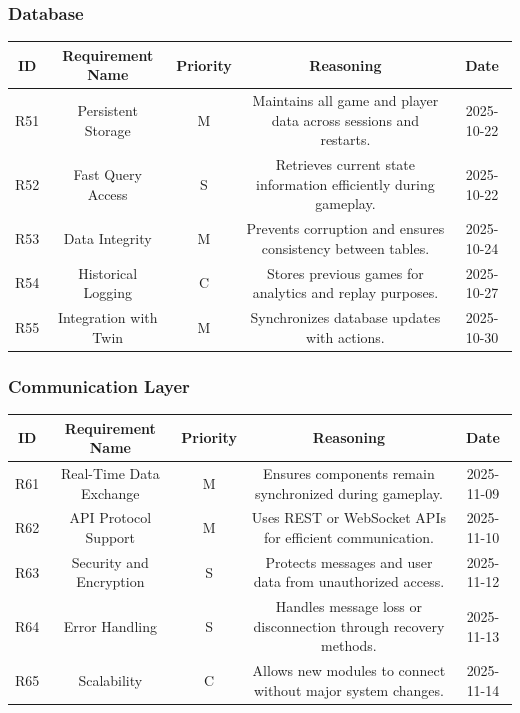 \documentclass{article}
\begin{document}
\vspace{1em}

\subsubsection*{\GameState{} Database}

\begin{tabular}{|c|c|c|c|c|}
\hline
\textbf{ID} & \textbf{Requirement Name} & \textbf{Priority} &
\textbf{Reasoning} & \textbf{Date} \\
\hline
R51 & Persistent Storage & M &
\parbox[t]{4cm}{Maintains all game and player data across sessions
and restarts.} &
2025-10-22 \\
\hline
R52 & Fast Query Access & S &
\parbox[t]{4cm}{Retrieves current state information efficiently
during gameplay.} &
2025-10-22 \\
\hline
R53 & Data Integrity & M &
\parbox[t]{4cm}{Prevents corruption and ensures consistency between
tables.} &
2025-10-24 \\
\hline
R54 & Historical Logging & C &
\parbox[t]{4cm}{Stores previous games for analytics and replay
purposes.} &
2025-10-27 \\
\hline
R55 & Integration with Twin & M &
\parbox[t]{4cm}{Synchronizes database updates with \DigitalTwin{}
actions.} &
2025-10-30 \\
\hline
\end{tabular}

\vspace{1em}

\subsubsection*{Communication Layer}

\begin{tabular}{|c|c|c|c|c|}
\hline
\textbf{ID} & \textbf{Requirement Name} & \textbf{Priority} &
\textbf{Reasoning} & \textbf{Date} \\
\hline
R61 & Real-Time Data Exchange & M &
\parbox[t]{4cm}{Ensures components remain synchronized during
gameplay.} &
2025-11-09 \\
\hline
R62 & API Protocol Support & M &
\parbox[t]{4cm}{Uses REST or WebSocket APIs for efficient
communication.} &
2025-11-10 \\
\hline
R63 & Security and Encryption & S &
\parbox[t]{4cm}{Protects messages and user data from unauthorized
access.} &
2025-11-12 \\
\hline
R64 & Error Handling & S &
\parbox[t]{4cm}{Handles message loss or disconnection through
recovery methods.} &
2025-11-13 \\
\hline
R65 & Scalability & C &
\parbox[t]{4cm}{Allows new modules to connect without major system
changes.} &
2025-11-14 \\
\hline
\end{tabular}
\end{document}
